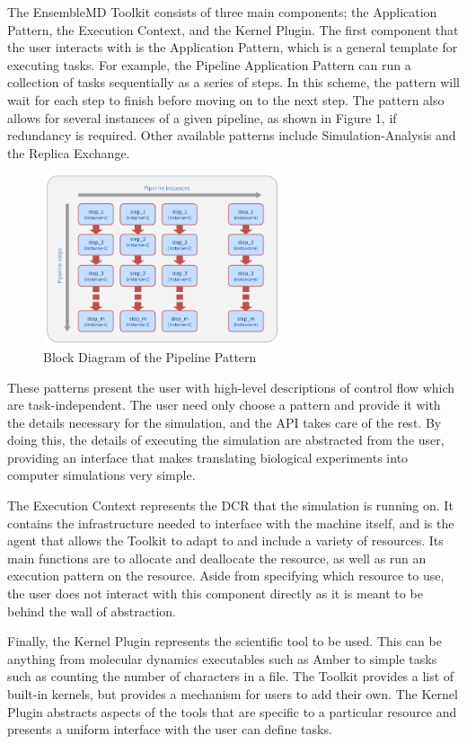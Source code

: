 \documentclass[conference]{IEEEtran}
\begin{document}
The EnsembleMD Toolkit consists of three main components; the Application Pattern, the Execution Context, and the Kernel Plugin. The first component that the user interacts with is the Application Pattern, which is a general template for executing tasks. For example, the Pipeline Application Pattern can run a collection of tasks sequentially as a series of steps. In this scheme, the pattern will wait for each step to finish before moving on to the next step. The pattern also allows for several instances of a given pipeline, as shown in Figure 1, if redundancy is required. Other available patterns include Simulation-Analysis and the Replica Exchange.

\begin{figure}[h]
\caption{Block Diagram of the Pipeline Pattern}
\centering
\includegraphics[width=7cm,height=5cm]{pipeline_pattern}
\end{figure}

These patterns present the user with high-level descriptions of control flow which are task-independent. The user need only choose a pattern and provide it with the details necessary for the simulation, and the API takes care of the rest. By doing this, the details of executing the simulation are abstracted from the user, providing an interface that makes translating biological experiments into computer simulations very simple.

The Execution Context represents the DCR that the simulation is running on. It contains the infrastructure needed to interface with the machine itself, and is the agent that allows the Toolkit to adapt to and include a variety of resources. Its main functions are to allocate and deallocate the resource, as well as run an execution pattern on the resource. Aside from specifying which resource to use, the user does not interact with this component directly as it is meant to be behind the wall of abstraction. 

Finally, the Kernel Plugin represents the scientific tool to be used. This can be anything from molecular dynamics executables such as Amber to simple tasks such as counting the number of characters in a file. The Toolkit provides a list of built-in kernels, but provides a mechanism for users to add their own. The Kernel Plugin abstracts aspects of the tools that are specific to a particular resource and presents a uniform interface with the user can define tasks.
\end{document}
